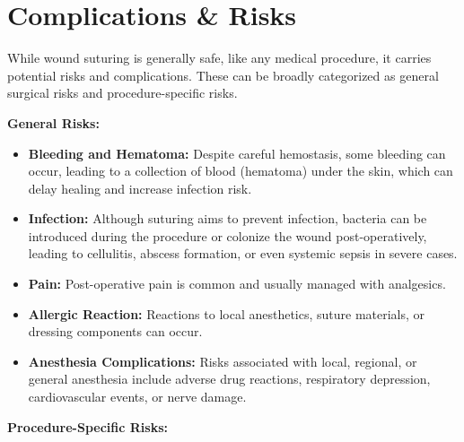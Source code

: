 \section*{Complications \& Risks}
While wound suturing is generally safe, like any medical procedure, it carries potential risks and complications. These can be broadly categorized as general surgical risks and procedure-specific risks.

\textbf{General Risks:}

\begin{itemize}
  \item \textbf{Bleeding and Hematoma:} Despite careful hemostasis, some bleeding can occur, leading to a collection of blood (hematoma) under the skin, which can delay healing and increase infection risk.
  
  \item \textbf{Infection:} Although suturing aims to prevent infection, bacteria can be introduced during the procedure or colonize the wound post-operatively, leading to cellulitis, abscess formation, or even systemic sepsis in severe cases.
  
  \item \textbf{Pain:} Post-operative pain is common and usually managed with analgesics.
  
  \item \textbf{Allergic Reaction:} Reactions to local anesthetics, suture materials, or dressing components can occur.
  
  \item \textbf{Anesthesia Complications:} Risks associated with local, regional, or general anesthesia include adverse drug reactions, respiratory depression, cardiovascular events, or nerve damage.
\end{itemize}

\textbf{Procedure-Specific Risks:}

